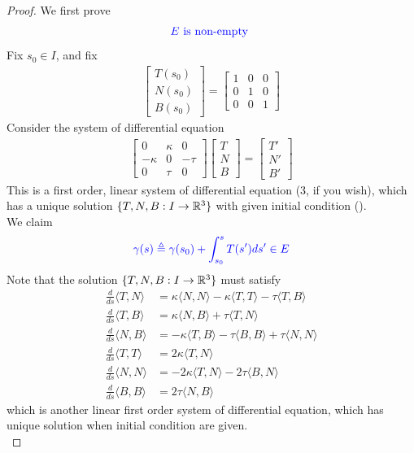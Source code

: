 \documentclass{report}
\begin{document}
\begin{proof}
We first prove 
\begin{align*}
\textcolor{blue}{E\text{ is non-empty }}
\end{align*}
Fix $s_0 \in I$, and fix 
\begin{align}
\label{inic}
\begin{bmatrix}
T(s_0)\\
N(s_0)\\
B(s_0)
\end{bmatrix}=\begin{bmatrix}
1 & 0 &0 \\
0 & 1 &0 \\
0 & 0 &1 
\end{bmatrix}
\end{align}
Consider the system of differential equation 
\begin{align*}
  \begin{bmatrix}
    0 & \kappa & 0 \\
    - \kappa & 0 & -\tau \\
    0 & \tau & 0 
  \end{bmatrix}\begin{bmatrix}
  T\\
  N\\
  B
  \end{bmatrix}=\begin{bmatrix}
  T'\\
  N'\\
  B'
  \end{bmatrix}
\end{align*}
This is a first order, linear system of differential equation (3, if you wish), which has a unique solution $\{ T,N,B:I\rightarrow \mathbb{R}^3 \}$ with given initial condition ().\\

We claim 
\begin{align*}
  \textcolor{blue}{\gamma (s)\triangleq \gamma (s_0)+\int_{s_0}^{s} T(s')ds'\in E}
\end{align*}
Note that the solution $\{ T,N,B:I\rightarrow \mathbb{R}^3 \}$ must satisfy 
\begin{align*}
  \frac{d}{ds}\langle T,N\rangle &= \kappa \langle N,N\rangle - \kappa\langle T,T\rangle - \tau \langle T,B\rangle \\
  \frac{d}{ds}\langle T,B\rangle &= \kappa \langle N,B\rangle + \tau \langle T,N \rangle \\
  \frac{d}{ds}\langle N,B\rangle &= -\kappa \langle T,B\rangle - \tau \langle B,B\rangle + \tau \langle N,N\rangle \\
  \frac{d}{ds}\langle T,T\rangle &= 2\kappa \langle T,N\rangle \\
 \frac{d}{ds}\langle N,N\rangle &= -2\kappa \langle T,N\rangle -2\tau \langle B,N\rangle \\
 \frac{d}{ds} \langle B,B\rangle &= 2\tau \langle N,B\rangle 
\end{align*}
which is another linear first order system of differential equation, which has unique solution when initial condition are given.\\


\end{proof}
\end{document}
